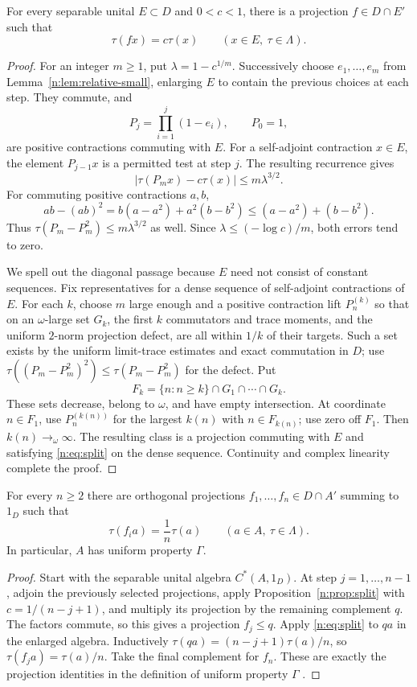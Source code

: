 \begin{proposition}\label{n:prop:split}
For every separable unital $E\subset D$ and $0<c<1$, there is a projection
$f\in D\cap E'$ such that
\begin{equation}\label{n:eq:split}
 \tau(fx)=c\tau(x)\qquad(x\in E,\ \tau\in \Lambda).
\end{equation}
\end{proposition}
\begin{proof}
For an integer $m\ge1$, put $\lambda=1-c^{1/m}$. Successively choose
$e_1,\ldots,e_m$ from Lemma~\ref{n:lem:relative-small}, enlarging $E$ to
contain the previous choices at each step. They commute, and
\[
 P_j=\prod_{i=1}^j(1-e_i),\qquad P_0=1,
\]
are positive contractions commuting with $E$. For a self-adjoint
contraction $x\in E$, the element $P_{j-1}x$ is a permitted test at step
$j$. The resulting recurrence gives
\[
 |\tau(P_mx)-c\tau(x)|\le m\lambda^{3/2}.
\]
For commuting positive contractions $a,b$,
\[
 ab-(ab)^2=b(a-a^2)+a^2(b-b^2)\le(a-a^2)+(b-b^2).
\]
Thus $\tau(P_m-P_m^2)\le m\lambda^{3/2}$ as well. Since
$\lambda\le(-\log c)/m$, both errors tend to zero.

We spell out the diagonal passage because $E$ need not consist of constant
sequences. Fix representatives for a dense sequence of self-adjoint
contractions of $E$. For each $k$, choose $m$ large enough and a positive
contraction lift $P_n^{(k)}$ so that on an $\omega$-large set $G_k$, the
first $k$ commutators and trace moments, and the uniform $2$-norm projection
defect, are all within $1/k$ of their targets. Such a set exists by the
uniform limit-trace estimates and exact commutation in $D$; use
$\tau((P_m-P_m^2)^2)\le\tau(P_m-P_m^2)$ for the defect. Put
\[
 F_k=\{n:n\ge k\}\cap G_1\cap\cdots\cap G_k.
\]
These sets decrease, belong to $\omega$, and have empty intersection. At
coordinate $n\in F_1$, use $P_n^{(k(n))}$ for the largest $k(n)$ with
$n\in F_{k(n)}$; use zero off $F_1$. Then $k(n)\to_\omega\infty$.
The resulting class is a projection commuting with $E$ and satisfying
\eqref{n:eq:split} on the dense sequence. Continuity and complex linearity
complete the proof.
\end{proof}

\begin{theorem}\label{n:thm:gamma}
For every $n\ge2$ there are orthogonal projections $f_1,\ldots,f_n\in
D\cap A'$ summing to $1_D$ such that
\[
 \tau(f_i a)=\frac1n\tau(a)\qquad(a\in A,\ \tau\in \Lambda).
\]
In particular, $A$ has uniform property $\Gamma$.
\end{theorem}
\begin{proof}
Start with the separable unital algebra $C^*(A,1_D)$. At step
$j=1,\ldots,n-1$, adjoin the previously selected projections, apply
Proposition~\ref{n:prop:split} with $c=1/(n-j+1)$, and multiply its
projection by the remaining complement $q$. The factors commute, so this
gives a projection $f_j\le q$. Apply \eqref{n:eq:split} to $qa$ in the
enlarged algebra. Inductively $\tau(qa)=(n-j+1)\tau(a)/n$, so
$\tau(f_ja)=\tau(a)/n$. Take the final complement for $f_n$.
These are exactly the projection identities in the definition of uniform
property $\Gamma$ \cite[Definition 2.1]{CETW}.
\end{proof}
